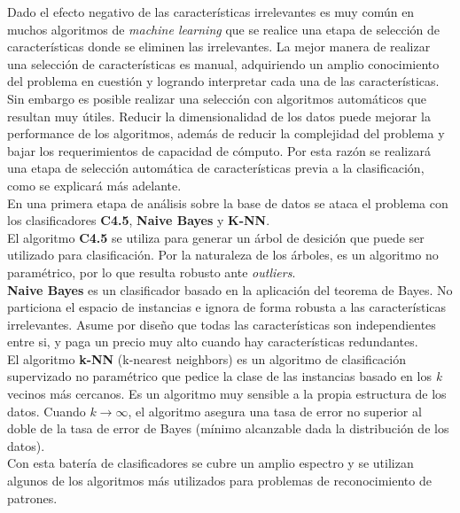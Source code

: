 \documentclass[12pt,a4paper,titlepage]{report}
\begin{document}
Dado el efecto negativo de las características irrelevantes es muy común en muchos algoritmos de \emph{machine learning} que se realice una etapa de selección de características donde se eliminen las irrelevantes. La mejor manera de realizar una selección de características es manual, adquiriendo un amplio conocimiento del problema en cuestión y logrando interpretar cada una de las características. Sin embargo es posible realizar una selección con algoritmos automáticos que resultan muy útiles. Reducir la dimensionalidad de los datos puede mejorar la performance de los algoritmos, además de reducir la complejidad del problema y bajar los requerimientos de capacidad de cómputo. Por esta razón se realizará una etapa de selección automática de características previa a la clasificación, como se explicará más adelante.\\ 

En una primera etapa de análisis sobre la base de datos se ataca el problema con los clasificadores \textbf{C4.5}, \textbf{Naive Bayes} y \textbf{K-NN}. \\

El algoritmo \textbf{C4.5} se utiliza para generar un árbol de desición que puede ser utilizado para clasificación. Por la naturaleza de los árboles, es un algoritmo no paramétrico, por lo que resulta robusto ante \emph{outliers}.\\

\textbf{Naive Bayes} es un clasificador basado en la aplicación del teorema de Bayes. No particiona el espacio de instancias e ignora de forma robusta a las características irrelevantes. Asume por diseño que todas las características son independientes entre si, y paga un precio muy alto cuando hay características redundantes.\\

El algoritmo \textbf{k-NN} (k-nearest neighbors) es un algoritmo de clasificación supervizado no paramétrico que pedice la clase de las instancias basado en los \emph{k} vecinos más cercanos. Es un algoritmo muy sensible a la propia estructura de los datos. Cuando $k\rightarrow \infty$, el algoritmo asegura una tasa de error no superior al doble de la tasa de error de Bayes (mínimo alcanzable dada la distribución de los datos).\\

Con esta batería de clasificadores se cubre un amplio espectro y se utilizan algunos de los algoritmos más utilizados para problemas de reconocimiento de patrones.\\
\end{document}

